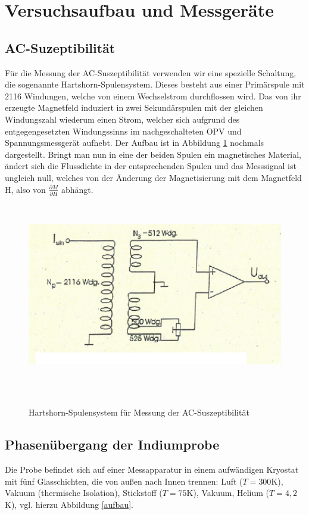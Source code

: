 \section{Versuchsaufbau und Messgeräte}
\subsection{AC-Suzeptibilität}
Für die Messung der AC-Suszeptibilität verwenden wir eine spezielle Schaltung, die sogenannte Hartshorn-Spulensystem. Dieses besteht aus einer Primärspule mit 2116 Windungen, welche von einem Wechselstrom durchflossen wird. Das von ihr erzeugte Magnetfeld induziert in zwei Sekundärspulen mit der gleichen Windungszahl wiederum einen Strom, welcher sich aufgrund des entgegengesetzten Windungssinns im nachgeschalteten OPV und Spannungsmessgerät aufhebt. Der Aufbau ist in Abbildung \ref{aufbau-AC} nochmals dargestellt. Bringt man nun in eine der beiden Spulen ein magnetisches Material, ändert sich die Flussdichte in der entsprechenden Spulen und das Messsignal ist ungleich null, welches von der Änderung der Magnetisierung mit dem Magnetfeld H, also von $\frac{\partial M}{\partial H}$ abhängt.


\begin{figure}[h!]
	\centering
	\includegraphics[height=8cm]{AC-auf.png}	
	~ %
	\caption{Hartshorn-Spulensystem für Messung der AC-Suszeptibilität \cite{Anleitung}}
	\label{aufbau-AC}
\end{figure}

\subsection{Phasenübergang der Indiumprobe}
Die Probe befindet sich auf einer Messapparatur in einem aufwändigen Kryostat mit fünf Glasschichten, die von außen nach Innen trennen: Luft ($T=300$K), Vakuum (thermische Isolation), Stickstoff ($T=75$K), Vakuum, Helium ($T=4,2$K), vgl. hierzu Abbildung \ref{aufbau}.

